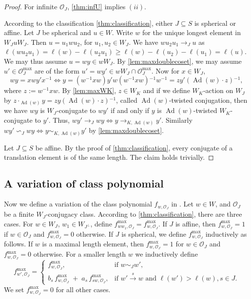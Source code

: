 \documentclass[a4paper, reqno, 14pt]{amsart}
\def\i{{^{-1}}}
\def\subset{\subseteq}
\def\co{\mathcal{O}}
\DeclareMathOperator{\Ad}{Ad}
\theoremstyle{definition}
\theoremstyle{remark}
\numberwithin{equation}{section}
\numberwithin{thm}{section}
\begin{document}
    \begin{proof}
        For infinite $\co_J$, \cref{thm:infU} implies $(ii)$.
        
        According to the classification \cref{thm:classification}, either $J\subset S$ is spherical or affine.
        Let $J$ be spherical and $u\in W$. Write $w$ for the unique longest element in $W_JuW_J$. Then $u=u_1wu_2$, for $u_1,u_2\in W_J$. We have $wu_2u_1\rightarrow_J u$ as $\ell(wu_2u_1)=\ell(w)-\ell(u_2u_1)\geq \ell(w)-\ell(u_2)-\ell(u_1)=\ell(u)$. We may thus assume $u=wy\in wW_J$. By \cref{lem:maxdoublecoset}, we may assume $u'\in\co^{\max}_J$ are of the form $u'=wy'\in wW_J\cap \co^{\max}_J$. Now for $x\in W_J$, $$wy=xwy'x\i \iff y=(w\i xw)y'w(w\i xw)\i w\i=zy'(\Ad(w)\cdot z)\i,$$
        where $z:=w\i xw$. By \cref{lem:maxWK}, $z\in W_K$ and if we define $W_K$-action on $W_J$ by $z\cdot_{\Ad(w)}y =zy(\Ad(w)\cdot z)\i$, called $\Ad(w)$-twisted conjugation, then we have $wy$ is $W_J$-conjugate to $wy'$ if and only if $y$ is $\Ad(w)$-twisted $W_K$-conjugate to $y'$. Thus, $wy'\rightarrow_J wy\iff y\rightarrow_{K,\Ad(w)} y'$. Similarly $wy'\backsim_J wy\iff y\sim_{K,\Ad(w)} y'$ by \cref{lem:maxdoublecoset}.

        Let $J\subset S$ be affine. By the proof of \cref{thm:classification}, every conjugate of a translation element is of the same length. The claim holds trivially.
    \end{proof}
    \subsection{A variation of class polynomial}
        Now we define a variation of the class polynomial $f_{w,\co_J}$ in \cite[\S 8.2]{geck2000characters}. Let $w\in W$, and $\co_J$ be a finite $W_J$-conjugacy class. According to \cref{thm:classification}, there are three cases. For $w\in W_J$, $w_1\in W_{J^\perp}$, define $f^{\max}_{ww_1,\co_J}=f^{\max}_{w,\co_J}$. If $J$ is affine, then $f^{\max}_{w,\co_J}=1$ if $w\in \co_J$ and $f^{\max}_{w,\co_J}=0$ otherwise. If $J$ is spherical, we define $f^{\max}_{w,\co_J}$ inductively as follows.
        If $w$ is a maximal length element, then $f^{\max}_{w,\co_J}=1$ for $w\in \co_J$ and $f^{\max}_{w,\co_J}=0$ otherwise.  For a smaller length $w$ we inductively define 
        \begin{equation} \label{eq:fmax-recursion}
            f^{\max}_{w',\co_J}
              = \begin{cases}
                  f^{\max}_{w,\co_J}, & \text{if } w \sim_J w', \\[6pt]
                  b_s\,f^{\max}_{w,\co_J} \;+\; a_s\,f^{\max}_{s w,\co_J}, & \text{if } w' \xrightarrow{s} w\text{ and } \ell(w')>\ell(w), s\in J.
                \end{cases}
        \end{equation}
        We set $f^{\max}_{w,\co_J}=0$ for all other cases.\\
\end{document}
